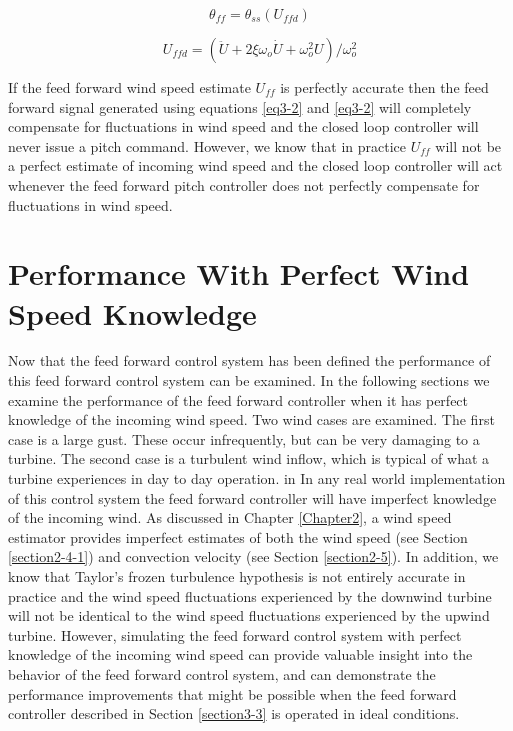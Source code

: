 \begin{equation}
	\theta_{ff} =  \theta_{ss}(U_{ffd}) \label{eq3-2}
\end{equation}

\begin{equation}
	U_{ffd} =  (\ddot{U} + 2 \xi \omega_o \dot{U} + \omega_o^2 U) / \omega_o^2 \label{eq3-3}
\end{equation}

If the feed forward wind speed estimate $U_{ff}$ is perfectly accurate then the feed forward signal generated using equations \ref{eq3-2} and \ref{eq3-2} will completely compensate for fluctuations in wind speed and the closed loop controller will never issue a pitch command. However, we know that in practice $U_{ff}$ will not be a perfect estimate of incoming wind speed and the closed loop controller will act whenever the feed forward pitch controller does not perfectly compensate for fluctuations in wind speed.

\section{Performance With Perfect Wind Speed Knowledge} \label{section3-4}

Now that the feed forward control system has been defined the performance of this feed forward control system can be examined. In the following sections we examine the performance of the feed forward controller when it has perfect knowledge of the incoming wind speed. Two wind cases are examined. The first case is a large gust. These occur infrequently, but can be very damaging to a turbine. The second case is a turbulent wind inflow, which is typical of what a turbine experiences in day to day operation. in In any real world implementation of this control system the feed forward controller will have imperfect knowledge of the incoming wind. As discussed in Chapter \ref{Chapter2}, a wind speed estimator provides imperfect estimates of both the wind speed (see Section  \ref{section2-4-1}) and convection velocity (see Section \ref{section2-5}). In addition, we know that Taylor's frozen turbulence hypothesis is not entirely accurate in practice and the wind speed fluctuations experienced by the downwind turbine will not be identical to the wind speed fluctuations experienced by the upwind turbine. However, simulating the feed forward control system with perfect knowledge of the incoming wind speed can provide valuable insight into the behavior of the feed forward control system, and can demonstrate the performance improvements that might be possible when the feed forward controller described in Section \ref{section3-3} is operated in ideal conditions. 



